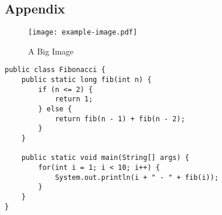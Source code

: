 \begin{appendices}
\chapter{Appendix}
\pagebreak

\begin{figure}[H]
	\centering
	 \caption{A Big Image}
	\texttt{[image: example-image.pdf]}
	\label{fig:appendixImage}
\end{figure}

\begin{lstlisting}[caption={Fibonacci}, label={lst:fibAppendix}, captionpos=t]
public class Fibonacci {
	public static long fib(int n) {
		if (n <= 2) {
			return 1;
		} else {
			return fib(n - 1) + fib(n - 2);
		}
	}

	public static void main(String[] args) {
		for(int i = 1; i < 10; i++) {
			System.out.println(i + " - " + fib(i));
		}
	}
}
\end{lstlisting}
\end{appendices}

